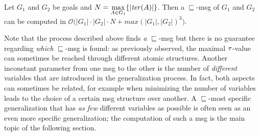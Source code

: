 
\begin{theorem}\label{thm-sqsubseteq-msg}
	Let $G_1$ and $G_2$ be goals and $N = \underset{A\in G_1}{\max}\{|\mathit{ter}(A)|\}$. Then a $\sqsubseteq$-msg of $G_1$ and $G_2$ can be computed in $\mathcal{O}\big(|G_1|\cdot |G_2|\cdot N +max(|G_1|,|G_2|)^3\big)$.
\end{theorem}
%	

Note that the process described above finds \textit{a} $\sqsubseteq$-msg but there is no guarantee regarding \textit{which} $\sqsubseteq$-msg is found: as previously observed, the maximal $\tau$-value can sometimes be reached through different atomic structures. Another inconstant parameter from one msg to the other is the number of \textit{different} variables that are introduced in the generalization process. In fact, both aspects can sometimes be related, for example when minimizing the number of variables leads to the choice of a certain msg structure over another. A $\sqsubseteq$-most specific generalization that has \textit{as few} different variables as possible is often seen as an even more specific generalization; the computation of such a msg is the main topic of the following section.
